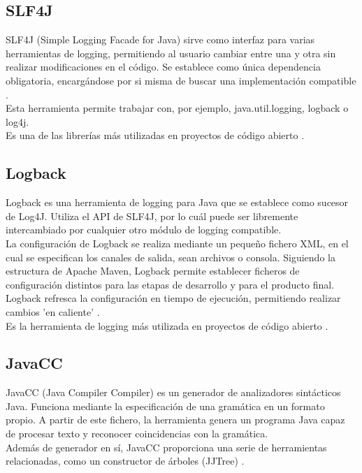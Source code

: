 \subsection{SLF4J}

SLF4J (Simple Logging Facade for Java) sirve como interfaz para varias herramientas de logging, permitiendo al usuario cambiar entre una y otra sin realizar modificaciones en el código.
Se establece como única dependencia obligatoria, encargándose por si misma de buscar una implementación compatible \cite{website:slf4j}.
\\
Esta herramienta permite trabajar con, por ejemplo, java.util.logging, logback o log4j.
\\
Es una de las librerías más utilizadas en proyectos de código abierto \cite{website:githubTOP}.

\subsection{Logback}

Logback es una herramienta de logging para Java que se establece como sucesor de Log4J.
Utiliza el API de SLF4J, por lo cuál puede ser libremente intercambiado por cualquier otro módulo de logging compatible.
\\
La configuración de Logback se realiza mediante un pequeño fichero XML, en el cual se especifican los canales de salida, sean archivos o consola.
Siguiendo la estructura de Apache Maven, Logback permite establecer ficheros de configuración distintos para las etapas de desarrollo y para el producto final.
Logback refresca la configuración en tiempo de ejecución, permitiendo realizar cambios 'en caliente' \cite{website:logback}.
\\
Es la herramienta de logging más utilizada en proyectos de código abierto \cite{website:githubTOP}.

\subsection{JavaCC}

JavaCC (Java Compiler Compiler) es un generador de analizadores sintácticos Java.
Funciona mediante la especificación de una gramática en un formato propio.
A partir de este fichero, la herramienta genera un programa Java capaz de procesar texto y reconocer coincidencias con la gramática.
\\
Además de generador en sí, JavaCC proporciona una serie de herramientas relacionadas, como un constructor de árboles (JJTree) \cite{website:javacc}.

